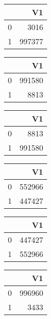 \bigskip\bigskip
\centering
\begin{tabular}{rr}
  \hline
 & V1 \\ 
  \hline
0 & 3016 \\ 
  1 & 997377 \\ 
   \hline
\end{tabular}

\bigskip\bigskip
\centering
\begin{tabular}{rr}
  \hline
 & V1 \\ 
  \hline
0 & 991580 \\ 
  1 & 8813 \\ 
   \hline
\end{tabular}

\bigskip\bigskip
\centering
\begin{tabular}{rr}
  \hline
 & V1 \\ 
  \hline
0 & 8813 \\ 
  1 & 991580 \\ 
   \hline
\end{tabular}

\bigskip\bigskip
\centering
\begin{tabular}{rr}
  \hline
 & V1 \\ 
  \hline
0 & 552966 \\ 
  1 & 447427 \\ 
   \hline
\end{tabular}

\bigskip\bigskip
\centering
\begin{tabular}{rr}
  \hline
 & V1 \\ 
  \hline
0 & 447427 \\ 
  1 & 552966 \\ 
   \hline
\end{tabular}

\bigskip\bigskip
\centering
\begin{tabular}{rr}
  \hline
 & V1 \\ 
  \hline
0 & 996960 \\ 
  1 & 3433 \\ 
   \hline
\end{tabular}

